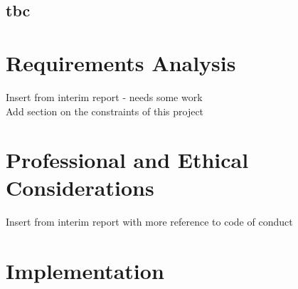 \documentclass{article}
\begin{document}
\subsection{tbc}

\newpage
\section{Requirements Analysis}
Insert from interim report - needs some work\\
Add section on the constraints of this project

\newpage
\section{Professional and Ethical Considerations}
Insert from interim report with more reference to code of conduct

\newpage
\section{Implementation}
\end{document}
